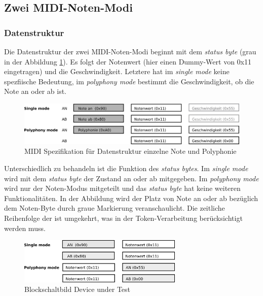 \subsection{Zwei MIDI-Noten-Modi}\label{note_modes}
\subsubsection{Datenstruktur}
Die Datenstruktur der zwei MIDI-Noten-Modi beginnt mit dem \textit{status byte} (grau in der Abbildung \ref{fig.testbench_single_Mode}). Es folgt der Notenwert (hier einen Dummy-Wert von 0x11 eingetragen) und die Geschwindigkeit. Letztere hat im \textit{single mode} keine spezfiische Bedeutung, im \textit{polyphony mode} bestimmt die Geschwindigkeit, ob die Note an oder ab ist.

\begin{figure}[H]
	\includegraphics[width=1\textwidth]{images/midi_interface/MIDI_Spezifikation.png}
	\caption{MIDI Spezifikation für Datenstruktur einzelne Note und Polyphonie}
	\label{fig.testbench_single_Mode}
\end{figure}

Unterschiedlich zu behandeln ist die Funktion des \textit{status bytes}. Im \textit{single mode} wird mit dem \textit{status byte} der Zustand an oder ab mitgegeben. Im \textit{polyphony mode} wird nur der Noten-Modus mitgeteilt und das \textit{status byte} hat keine weiteren Funktionalitäten. In der Abbildung wird der Platz von Note an oder ab bezüglich dem Noten-Byte durch graue Markierung veranschaulicht. Die zeitliche Reihenfolge der ist umgekehrt, was in der Token-Verarbeitung berücksichtigt werden muss.

\begin{figure}[H]
	\includegraphics[width=0.7\textwidth]{images/midi_interface/MIDI_Spezifikation_Datenfolge.png}
	\caption{Blockschaltbild Device under Test}
	\label{fig.testbench_polypphon_mode}
\end{figure}

